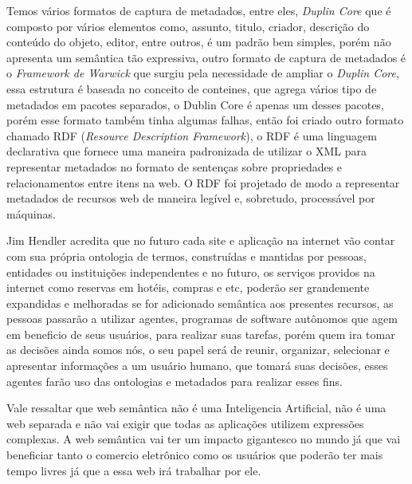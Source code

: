 Temos vários formatos de captura de metadados, entre eles, \textit{Duplin Core} que é composto por vários elementos como, assunto, titulo, criador, descrição do conteúdo do objeto, editor, entre outros, é um padrão bem simples, porém não apresenta um semântica tão expressiva, outro formato de captura de metadados é o \textit{Framework de Warwick} que surgiu pela necessidade de ampliar o \textit{Duplin Core}, essa estrutura é baseada no conceito de conteines, que agrega vários tipo de metadados em pacotes separados, o Dublin Core é apenas um desses pacotes, porém esse formato também tinha algumas falhas, então foi criado outro formato chamado RDF (\textit{Resource Description Framework}), o RDF é uma linguagem declarativa que fornece uma maneira padronizada de utilizar o XML para representar metadados no formato de sentenças sobre propriedades e relacionamentos entre itens na web. O RDF foi projetado de modo a representar metadados de recursos web de maneira legível e, sobretudo, processável por máquinas.

Jim Hendler acredita que no futuro cada site e aplicação na internet vão contar com sua própria ontologia de termos, construídas e mantidas por pessoas, entidades ou instituições independentes e no futuro, os serviços providos na internet como reservas em hotéis, compras e etc, poderão ser grandemente expandidas e melhoradas se for adicionado semântica aos presentes recursos, as pessoas passarão a utilizar agentes, programas de software autônomos que agem em beneficio de seus usuários, para realizar suas tarefas, porém quem ira tomar as decisões ainda somos nós, o seu papel será de reunir, organizar, selecionar e apresentar informações a um usuário humano, que tomará suas decisões, esses agentes farão uso das ontologias e metadados para realizar esses fins.

Vale ressaltar que web semântica não é uma Inteligencia Artificial, não é uma web separada e não vai exigir que todas as aplicações utilizem expressões complexas. A web semântica vai ter um impacto gigantesco no mundo já que vai beneficiar tanto o comercio eletrônico como os usuários que poderão ter mais tempo livres já que a essa web irá trabalhar por ele.